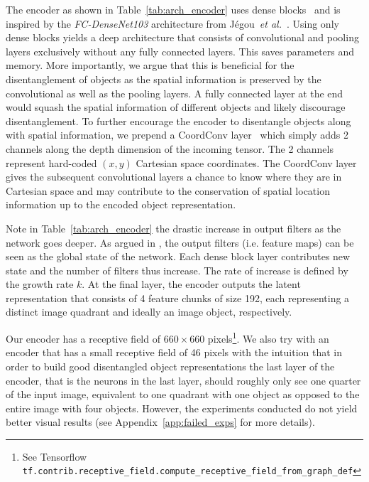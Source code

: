 \documentclass[12pt,a4paper]{article}
\begin{document}
The encoder as shown in Table~\ref{tab:arch_encoder} uses dense blocks~\cite{DenseNet} and is inspired by the \textit{FC-DenseNet103} architecture from Jégou~\textit{et al.}~\cite{Tiramisu}. Using only dense blocks yields a deep architecture that consists of convolutional and pooling layers exclusively without any fully connected layers. This saves parameters and memory. More importantly, we argue that this is beneficial for the disentanglement of objects as the spatial information is preserved by the convolutional as well as the pooling layers. A fully connected layer at the end would squash the spatial information of different objects and likely discourage disentanglement. To further encourage the encoder to disentangle objects along with spatial information, we prepend a CoordConv layer~\cite{CoordConv} which simply adds 2 channels along the depth dimension of the incoming tensor. The 2 channels represent hard-coded $(x,y)$ Cartesian space coordinates. The CoordConv layer gives the subsequent convolutional layers a chance to know where they are in Cartesian space and may contribute to the conservation of spatial location information up to the encoded object representation. 

Note in Table~\ref{tab:arch_encoder} the drastic increase in output filters as the network goes deeper. As argued in \cite{DenseNet}, the output filters (i.e. feature maps) can be seen as the global state of the network. Each dense block layer contributes new state and the number of filters thus increase. The rate of increase is defined by the growth rate $k$. At the final layer, the encoder outputs the latent representation that consists of 4 feature chunks of size 192, each representing a distinct image quadrant and ideally an image object, respectively.

Our encoder has a receptive field of $660 \times 660$ pixels\footnote{See Tensorflow \texttt{tf.contrib.receptive\_field.compute\_receptive\_field\_from\_graph\_def}}. We also try with an encoder that has a small receptive field of 46 pixels with the intuition that in order to build good disentangled object representations the last layer of the encoder, that is the neurons in the last layer, should roughly only see one quarter of the input image, equivalent to one quadrant with one object as opposed to the entire image with four objects. However, the experiments conducted do not yield better visual results (see Appendix~\ref{app:failed_exps} for more details).
\end{document}
